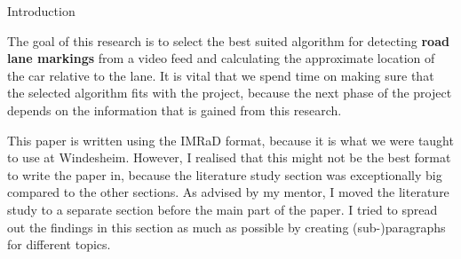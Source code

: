 \documentclass{matthijs}
\begin{document}
\begin{hoofdstuk}{Introduction}
		\bigskip

		The goal of this research is to select the best suited algorithm for detecting \textbf{road lane markings} from a video feed and calculating the approximate location of the car relative to the lane.
		It is vital that we spend time on making sure that the selected algorithm fits with the project, because the next phase of the project depends on the information that is gained from this research.

		\bigskip

		This paper is written using the IMRaD format, because it is what we were taught to use at Windesheim.
		However, I realised that this might not be the best format to write the paper in, because the literature study section was exceptionally big compared to the other sections.
		As advised by my mentor, I moved the literature study to a separate section before the main part of the paper.
		I tried to spread out the findings in this section as much as possible by creating (sub-)paragraphs for different topics.

	\end{hoofdstuk}
	
\end{document}
